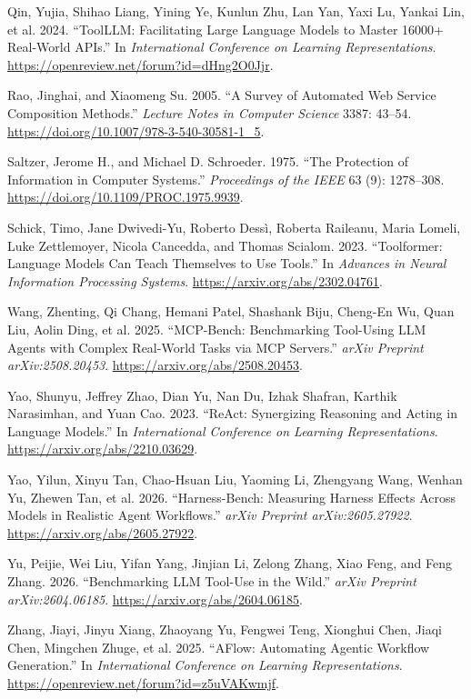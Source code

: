 \documentclass[
  10pt,
]{article}
\newlength{\cslhangindent}
\newenvironment{CSLReferences}[2] %
 {\begin{list}{}{%
  \setlength{\itemindent}{0pt}
  \setlength{\leftmargin}{0pt}
  \setlength{\parsep}{0pt}
  \ifodd #1
   \setlength{\leftmargin}{\cslhangindent}
   \setlength{\itemindent}{-1\cslhangindent}
  \fi
  \setlength{\itemsep}{#2\baselineskip}}}
 {\end{list}}
\begin{document}
\begin{CSLReferences}{1}{0}
Qin, Yujia, Shihao Liang, Yining Ye, Kunlun Zhu, Lan Yan, Yaxi Lu,
Yankai Lin, et al. 2024. {``ToolLLM: Facilitating Large Language Models
to Master 16000+ Real-World APIs.''} In \emph{International Conference
on Learning Representations}.
\url{https://openreview.net/forum?id=dHng2O0Jjr}.

Rao, Jinghai, and Xiaomeng Su. 2005. {``A Survey of Automated Web
Service Composition Methods.''} \emph{Lecture Notes in Computer Science}
3387: 43--54. \url{https://doi.org/10.1007/978-3-540-30581-1_5}.

Saltzer, Jerome H., and Michael D. Schroeder. 1975. {``The Protection of
Information in Computer Systems.''} \emph{Proceedings of the IEEE} 63
(9): 1278--308. \url{https://doi.org/10.1109/PROC.1975.9939}.

Schick, Timo, Jane Dwivedi-Yu, Roberto Dessì, Roberta Raileanu, Maria
Lomeli, Luke Zettlemoyer, Nicola Cancedda, and Thomas Scialom. 2023.
{``Toolformer: Language Models Can Teach Themselves to Use Tools.''} In
\emph{Advances in Neural Information Processing Systems}.
\url{https://arxiv.org/abs/2302.04761}.

Wang, Zhenting, Qi Chang, Hemani Patel, Shashank Biju, Cheng-En Wu, Quan
Liu, Aolin Ding, et al. 2025. {``MCP-Bench: Benchmarking Tool-Using LLM
Agents with Complex Real-World Tasks via MCP Servers.''} \emph{arXiv
Preprint arXiv:2508.20453}. \url{https://arxiv.org/abs/2508.20453}.

Yao, Shunyu, Jeffrey Zhao, Dian Yu, Nan Du, Izhak Shafran, Karthik
Narasimhan, and Yuan Cao. 2023. {``ReAct: Synergizing Reasoning and
Acting in Language Models.''} In \emph{International Conference on
Learning Representations}. \url{https://arxiv.org/abs/2210.03629}.

Yao, Yilun, Xinyu Tan, Chao-Hsuan Liu, Yaoming Li, Zhengyang Wang,
Wenhan Yu, Zhewen Tan, et al. 2026. {``Harness-Bench: Measuring Harness
Effects Across Models in Realistic Agent Workflows.''} \emph{arXiv
Preprint arXiv:2605.27922}. \url{https://arxiv.org/abs/2605.27922}.

Yu, Peijie, Wei Liu, Yifan Yang, Jinjian Li, Zelong Zhang, Xiao Feng,
and Feng Zhang. 2026. {``Benchmarking LLM Tool-Use in the Wild.''}
\emph{arXiv Preprint arXiv:2604.06185}.
\url{https://arxiv.org/abs/2604.06185}.

Zhang, Jiayi, Jinyu Xiang, Zhaoyang Yu, Fengwei Teng, Xionghui Chen,
Jiaqi Chen, Mingchen Zhuge, et al. 2025. {``AFlow: Automating Agentic
Workflow Generation.''} In \emph{International Conference on Learning
Representations}. \url{https://openreview.net/forum?id=z5uVAKwmjf}.

\end{CSLReferences}
\end{document}
